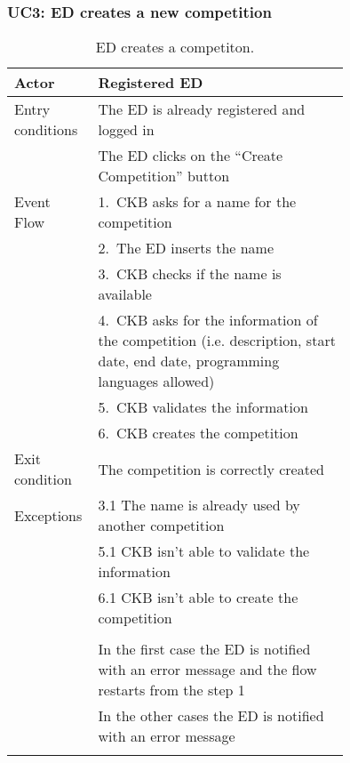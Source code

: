 \subsubsection*{UC3: ED creates a new competition}
\begin{center}
  \begin{longtable}{l|p{0.75\linewidth}}
    \hline
    Actor & Registered ED \\
    \hline
    Entry conditions & The ED is already registered and logged in  \\
    & The ED clicks on the “Create Competition” button \\
    \hline
    Event Flow & 1.\ CKB asks for a name for the competition \\
    & 2.\ The ED inserts the name \\
    & 3.\ CKB checks if the name is available \\
    & 4.\ CKB asks for the information of the competition (i.e. description, start date, end date, programming languages allowed) \\
    & 5.\ CKB validates the information \\
    & 6.\ CKB creates the competition \\
    \hline
    Exit condition & The competition is correctly created \\
    \hline
    Exceptions & 3.1 The name is already used by another competition \\
    & 5.1 CKB isn’t able to validate the information \\
    & 6.1 CKB isn’t able to create the competition \\ \\
    & In the first case the ED is notified with an error message and the flow restarts from the step 1 \\
    & In the other cases the ED is notified with an error message \\
    \hline
    \caption{ED creates a competiton.}
    \label{tab: ED_create_competition}
  \end{longtable}
\end{center}

